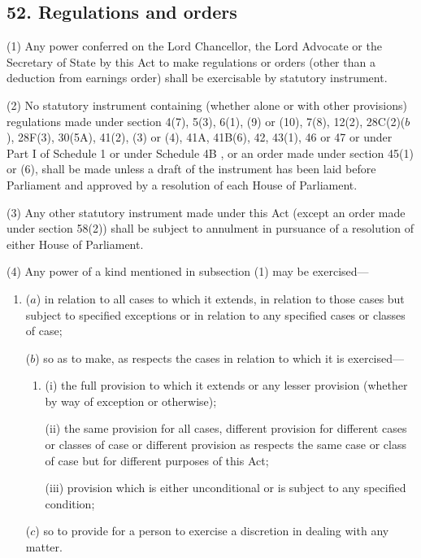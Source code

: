 \documentclass[12pt,a4paper]{article}
\begin{document}

\subsection{52. Regulations and orders}

(1) Any power conferred on the Lord Chancellor, the Lord Advocate or the Secretary of State by this Act to make regulations or orders (other than a deduction from earnings order) shall be exercisable by statutory instrument.

(2) No statutory instrument containing (whether alone or with other provisions) regulations made under section 4(7), 5(3), 6(1), (9)  or (10), 7(8), 12(2), 
28C(2)($b$), 28F(3), 30(5A),  %
41(2), (3)  or (4), 
41A, 41B(6),  %
42, 43(1), 46 or 47 or under Part I of Schedule 1
or under Schedule 4B%
, or an order made under section 45(1)  or (6), shall be made unless a draft of the instrument has been laid before Parliament and approved by a resolution of each House of Parliament.

(3) Any other statutory instrument made under this Act (except an order made under section 58(2)) shall be subject to annulment in pursuance of a resolution of either House of Parliament.

(4) Any power of a kind mentioned in subsection (1)  may be exercised—
\begin{enumerate}\item[]
($a$) in relation to all cases to which it extends, in relation to those cases but subject to specified exceptions or in relation to any specified cases or classes of case;

($b$) so as to make, as respects the cases in relation to which it is exercised—
\begin{enumerate}\item[]
(i) the full provision to which it extends or any lesser provision (whether by way of exception or otherwise);

(ii) the same provision for all cases, different provision for different cases or classes of case or different provision as respects the same case or class of case but for different purposes of this Act;

(iii) provision which is either unconditional or is subject to any specified condition;
\end{enumerate}

($c$) so to provide for a person to exercise a discretion in dealing with any matter.
\end{enumerate}
\end{document}
